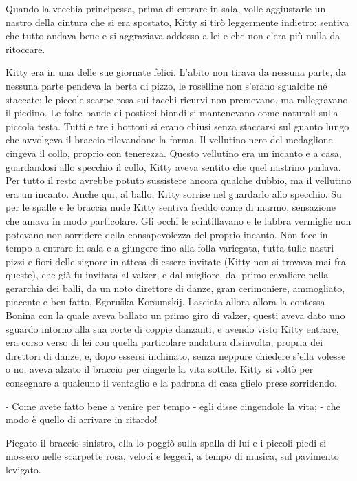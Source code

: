 Quando la vecchia principessa, prima di entrare in sala, volle aggiustarle un nastro della cintura che si era spostato, Kitty si tirò leggermente indietro: sentiva che tutto andava bene e si aggraziava addosso a lei e che non c'era più nulla da ritoccare. 

Kitty era in una delle sue giornate felici. L'abito non tirava da nessuna parte, da nessuna parte pendeva la berta di pizzo, le roselline non s'erano sgualcite né staccate; le piccole scarpe rosa sui tacchi ricurvi non premevano, ma rallegravano il piedino. Le folte bande di posticci biondi si mantenevano come naturali sulla piccola testa. Tutti e tre i bottoni si erano chiusi senza staccarsi sul guanto lungo che avvolgeva il braccio rilevandone la forma. Il vellutino nero del medaglione cingeva il collo, proprio con tenerezza. Questo vellutino era un incanto e a casa, guardandosi allo specchio il collo, Kitty aveva sentito che quel nastrino parlava. Per tutto il resto avrebbe potuto sussistere ancora qualche dubbio, ma il vellutino era un incanto. Anche qui, al ballo, Kitty sorrise nel guardarlo allo specchio. Su per le spalle e le braccia nude Kitty sentiva freddo come di marmo, sensazione che amava in modo particolare. Gli occhi le scintillavano e le labbra vermiglie non potevano non sorridere della consapevolezza del proprio incanto. Non fece in tempo a entrare in sala e a giungere fino alla folla variegata, tutta tulle nastri pizzi e fiori delle signore in attesa di essere invitate (Kitty non si trovava mai fra queste), che già fu invitata al valzer, e dal migliore, dal primo cavaliere nella gerarchia dei balli, da un noto direttore di danze, gran cerimoniere, ammogliato, piacente e ben fatto, Egoruška Korsunskij. Lasciata allora allora la contessa Bonina con la quale aveva ballato un primo giro di valzer, questi aveva dato uno sguardo intorno alla sua corte di coppie danzanti, e avendo visto Kitty entrare, era corso verso di lei con quella particolare andatura disinvolta, propria dei direttori di danze, e, dopo essersi inchinato, senza neppure chiedere s'ella volesse o no, aveva alzato il braccio per cingerle la vita sottile. Kitty si voltò per consegnare a qualcuno il ventaglio e la padrona di casa glielo prese sorridendo. 

- Come avete fatto bene a venire per tempo - egli disse cingendole la vita; - che modo è quello di arrivare in ritardo! 

Piegato il braccio sinistro, ella lo poggiò sulla spalla di lui e i piccoli piedi si mossero nelle scarpette rosa, veloci e leggeri, a tempo di musica, sul pavimento levigato. 

